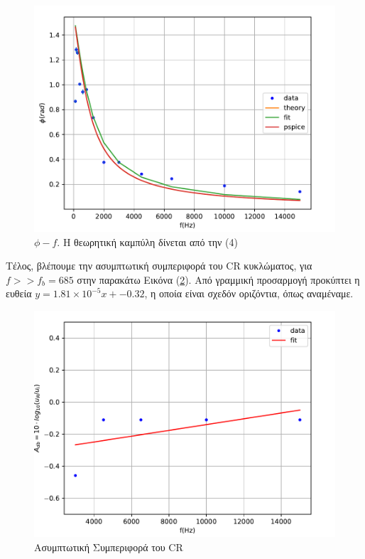 \documentclass[a4paper]{article}
\begin{document}
		\begin{figure}[h!]
			\centering 
			\includegraphics[scale=0.7]{../plots/CR_f-phi.pdf}
			\caption{$\phi - f$. Η θεωρητική καμπύλη δίνεται από την (4)}
			\label{fig5}
		\end{figure}
		
		
			
	Τέλος, βλέπουμε την ασυμπτωτική συμπεριφορά του CR κυκλώματος, για $f >> f_b = 685$ στην παρακάτω Εικόνα (\ref{fig6}). Από γραμμική προσαρμογή προκύπτει η ευθεία $y= 1.81\times10^{-5} x + -0.32$, η οποία είναι σχεδόν οριζόντια, όπως αναμέναμε.
	
		\begin{figure}[h!]
			\centering 
			\includegraphics[scale=0.7]{../plots/CR_f-Adb-linear.pdf}
			\caption{Ασυμπτωτική Συμπεριφορά του CR}
			\label{fig6}
		\end{figure}
	
\end{document}
